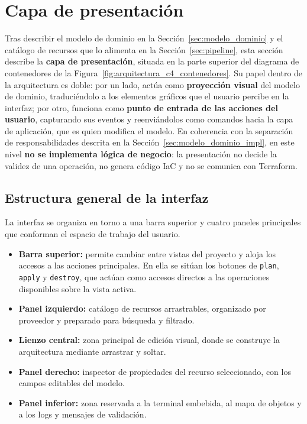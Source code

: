 \documentclass{article}
\begin{document}
    \section{Capa de presentación}
    {
        \setlength{\parskip}{1em}
        \label{sec:capa_presentacion}
        \justify
        Tras describir el modelo de dominio en la Sección~\ref{sec:modelo_dominio}
        y el catálogo de recursos que lo alimenta en la
        Sección~\ref{sec:pipeline}, esta sección describe la \textbf{capa de
        presentación}, situada en la parte superior del diagrama de contenedores
        de la Figura~\ref{fig:arquitectura_c4_contenedores}. Su papel dentro de
        la arquitectura es doble: por un lado, actúa como \textbf{proyección
        visual} del modelo de dominio, traduciéndolo a los elementos gráficos
        que el usuario percibe en la interfaz; por otro, funciona como
        \textbf{punto de entrada de las acciones del usuario}, capturando sus
        eventos y reenviándolos como comandos hacia la capa de aplicación, que
        es quien modifica el modelo. En coherencia con la separación de
        responsabilidades descrita en la Sección~\ref{sec:modelo_dominio_impl},
        en este nivel \textbf{no se implementa lógica de negocio}: la
        presentación no decide la validez de una operación, no genera código
        IaC y no se comunica con Terraform.

        \subsection{Estructura general de la interfaz}
        \justify
        La interfaz se organiza en torno a una barra superior y cuatro paneles
        principales que conforman el espacio de trabajo del usuario.

        \begin{itemize}
            \item \textbf{Barra superior:} permite cambiar entre vistas del
            proyecto y aloja los accesos a las acciones principales. En ella se
            sitúan los botones de \texttt{plan}, \texttt{apply} y
            \texttt{destroy}, que actúan como accesos directos a las operaciones
            disponibles sobre la vista activa.
            \item \textbf{Panel izquierdo:} catálogo de recursos arrastrables,
            organizado por proveedor y preparado para búsqueda y filtrado.
            \item \textbf{Lienzo central:} zona principal de edición visual,
            donde se construye la arquitectura mediante arrastrar y soltar.
            \item \textbf{Panel derecho:} inspector de propiedades del recurso
            seleccionado, con los campos editables del modelo.
            \item \textbf{Panel inferior:} zona reservada a la terminal embebida,
            al mapa de objetos y a los logs y mensajes de validación.
        \end{itemize}

}
\end{document}
